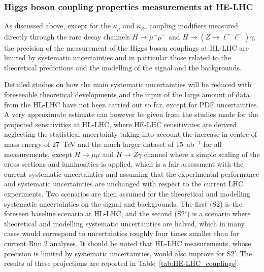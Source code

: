 \subsubsection{Higgs boson coupling properties measurements at HE-LHC}
\label{sec2:HE-LHC_couplings} 

As discussed above, except for the $\kappa_{\mu}$ and
$\kappa_{Z\gamma}$ coupling modifiers measured directly through the
rare decay channels $H\rightarrow \mu^+\mu^-$ and $H\rightarrow (Z
\rightarrow \ell^+\ell^-)\gamma$, the precision of the measurement of
the Higgs boson couplings at HL-LHC are limited by systematic
uncertainties and in particular those related to the theoretical
predictions and the modelling of the signal and the backgrounds.

Detailed studies on how the main systematic uncertainties will be
reduced with foreseeable theoretical developments and the input of the
large amount of data from the HL-LHC have not been carried out so far,
except for PDF uncertainties. A very approximate estimate can however
be given from the studies made for the projected sensitivities at
HL-LHC, where HE-LHC sensitivities are derived neglecting the
statistical uncertainty taking into account the increase in
centre-of-mass energy of 27~TeV and the much larger dataset of
15~ab$^{-1}$ for all measurements, except $H \rightarrow \mu\mu$ and $H \rightarrow Z\gamma$ channel where a simple scaling of the cross sections and luminosities is applied, which is a fair assessment with the current systematic uncertainties and assuming that the experimental performance and
systematic uncertainties are unchanged with respect to the current LHC
experiments. Two scenarios are then assumed for the theoretical and
modelling systematic uncertainties on the signal and backgrounds. The
first (S2) is the foreseen baseline scenario at HL-LHC, and the second (S2$'$) is a scenario where theoretical and modelling systematic
uncertainties are halved, which in many cases would  correspond to uncertainties roughly four times smaller than for current Run 2 analyses. It should be noted that HL-LHC measurements, whose precision is limited by systematic uncertainties, would also improve for S2'. The results of these projections are
reported in Table~\ref{tab:HE-LHC_couplings}. 

